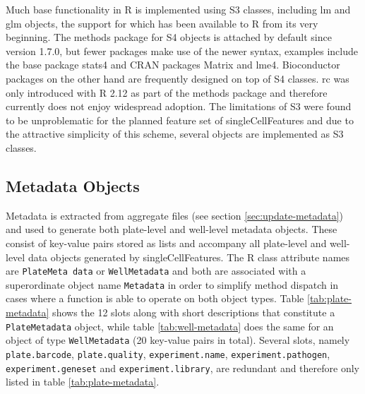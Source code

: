 Much base functionality in R is implemented using S3 classes, including lm and glm objects, the support for which has been available to R from its very beginning. The methods package for S4 objects is attached by default since version 1.7.0, but fewer packages make use of the newer syntax, examples include the base package stats4 and CRAN packages Matrix and lme4. Bioconductor packages on the other hand are frequently designed on top of S4 classes. \Gls{rc} was only introduced with R 2.12 as part of the methods package and therefore currently does not enjoy widespread adoption. The limitations of S3 were found to be unproblematic for the planned feature set of singleCellFeatures and due to the attractive simplicity of this scheme, several objects are implemented as S3 classes.

\subsection{Metadata Objects}

Metadata is extracted from aggregate files (see section \ref{sec:update-metadata}) and used to generate both plate-level and well-level metadata objects. These consist of key-value pairs stored as lists and accompany all plate-level and well-level data objects generated by singleCellFeatures. The R class attribute names are \texttt{PlateMeta data} or \texttt{WellMetadata} and both are associated with a superordinate object name \texttt{Metadata} in order to simplify method dispatch in cases where a function is able to operate on both object types. Table \ref{tab:plate-metadata} shows the 12 slots along with short descriptions that constitute a \texttt{PlateMetadata} object, while table \ref{tab:well-metadata} does the same for an object of type \texttt{WellMetadata} (20 key-value pairs in total). Several slots, namely \texttt{plate.barcode}, \texttt{plate.quality}, \texttt{experiment.name}, \texttt{experiment.pathogen}, \texttt{experiment.geneset} and \texttt{experiment.library}, are redundant and therefore only listed in table \ref{tab:plate-metadata}.

